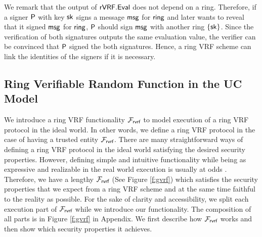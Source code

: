 We remark that the output of $ {\mathsf{rVRF}}.{\mathsf{Eval}} $ does not depend on a ring. Therefore, if a signer $ \mathsf{P} $ with key $ \mathsf{sk} $ signs a message $ \mathsf{msg} $ for $ \mathsf{ring} $ and later wants to reveal that it signed $ \mathsf{msg} $  for $ \mathsf{ring} $, $ \mathsf{P} $ should sign $ \mathsf{msg} $ with another ring $ \{\mathsf{sk}\} $. Since the verification of both signatures outputs the same evaluation value, the verifier can be convinced that $ \mathsf{P} $ signed the both signatures. Hence, a ring VRF scheme can link the identities of the signers if it is necessary.




\subsection{Ring Verifiable Random Function in the UC Model}
\label{subsec:uc_model}
We introduce a ring VRF functionality $ \mathcal{F}_{\textsf{rvrf}} $ to model execution of a ring VRF protocol in the ideal world. In other words, we define a ring VRF protocol in the case of having a trusted entity $ \mathcal{F}_{\textsf{rvrf}} $. There are many straightforward ways of defining a ring VRF protocol in the ideal world satisfying the desired security properties. However, defining simple and intuitive functionality while being as expressive and realizable in the real world execution is usually at odds \cite{canetti1}. Therefore, we have a lengthy $ \mathcal{F}_{\textsf{rvrf}} $ (See Figure \ref{f:gvrf}) which satisfies the security properties that we expect from a ring VRF scheme and at the same time faithful to the reality as possible. For the sake of clarity and accessibility, we split each execution part of $ \mathcal{F}_{\textsf{rvrf}} $ while we introduce our functionality. The composition of all parts is in Figure \ref{f:gvrf} in Appendix. We first describe how $  \mathcal{F}_{\textsf{rvrf}} $ works and then show which security properties it achieves.


